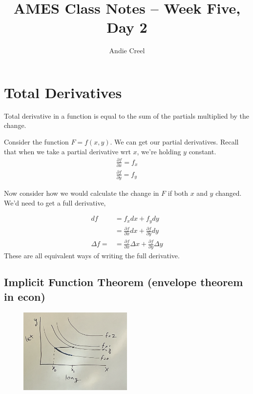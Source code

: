 \documentclass{article}
\title{AMES Class Notes -- Week Five, Day 2}
\author{Andie Creel}
\begin{document}
\maketitle

\section{Total Derivatives}
Total derivative in a function is equal to the sum of the partials multiplied by the change. 

Consider the function $ F = f(x,y)$. We can get our partial derivatives. Recall that when we take a partial derivative wrt $x$, we're holding $y$ constant.
\begin{align}
    \frac{\partial f}{\partial x} = f_x\\
    \frac{\partial f}{\partial y} = f_y
\end{align}

Now consider how we would calculate the change in $F$ if both $x$ and $y$ changed. We'd need to get a full derivative, 

\begin{align}
    df &= f_x dx + f_y dy \\
    &= \frac{\partial f}{\partial x} dx + \frac{\partial f}{\partial y} dy\\
    \Delta f = &= \frac{\partial f}{\partial x} \Delta x + \frac{\partial f}{\partial y} \Delta y
\end{align}
These are all equivalent ways of writing the full derivative. 


\subsection{Implicit Function Theorem (envelope theorem in econ)}

\begin{figure}[htp]
    \centering
        \includegraphics[width=0.5\textwidth]{Screen Shot 2023-09-27 at 10.59.32 AM.png}
\end{figure}
\end{document}
